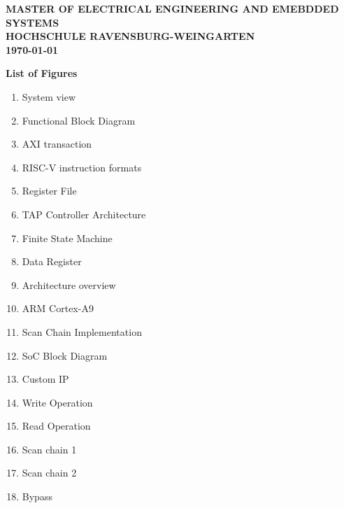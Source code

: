 \documentclass{report}
\begin{document}
\begin{titlepage}

\vspace{25mm}
\begin{center}

\textbf{\Large MASTER OF ELECTRICAL ENGINEERING AND EMEBDDED SYSTEMS}\\[0.4cm]
\vspace{5mm}
\textbf{\Large HOCHSCHULE RAVENSBURG-WEINGARTEN}\\[0.4cm]
\vspace{5mm}
\textbf{\Large \today}
\end{center}
 \end{titlepage}

\tableofcontents
\newpage
\textbf{\Large List of Figures}
\vspace{3mm}
\begin{enumerate}[ align=right, itemsep=5pt] %
  \item System view 
  \item  Functional Block Diagram
  \item   AXI transaction 
  \item RISC-V instruction formats 
  \item    Register File 
  \item    TAP Controller Architecture 
  \item    Finite State Machine 
  \item   Data Register
  \item   Architecture overview 
  \item    ARM Cortex-A9
  \item    Scan Chain Implementation
  \item     SoC Block Diagram 
  \item    Custom IP 
  \item    Write Operation 
  \item   Read Operation 
  \item   Scan chain 1 
  \item   Scan chain 2 
  \item    Bypass 
  
\end{enumerate}
\end{document}
